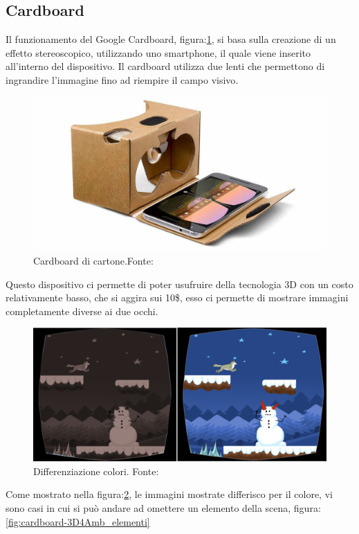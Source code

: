 \documentclass[
a4paper,
cleardoublepage=empty,
headings=twolinechapter,
numbers=autoenddot,
]{scrbook}
\begin{document}
	\subsection{Cardboard}\label{chap:cardboard}
    Il funzionamento del Google Cardboard, figura:\ref{fig:cardboard}, si basa sulla creazione di un effetto stereoscopico\cite{Stereoscopio}, utilizzando uno smartphone, il quale viene inserito all'interno del dispositivo.
	Il cardboard utilizza due lenti che permettono di ingrandire l'immagine fino ad riempire il campo visivo\cite{Funzionamento_cardboard}.
	\begin{figure}[H]
		\centering
		\includegraphics[width=0.8\linewidth]{image/cardboard}
		\caption{Cardboard di cartone.Fonte:\cite{Cardboard_image}}
		\label{fig:cardboard}
	\end{figure}
	Questo dispositivo ci permette di poter usufruire della tecnologia 3D con un costo relativamente basso, che si aggira sui 10\$, esso ci permette di mostrare immagini completamente diverse ai due occhi.
	\begin{figure}[H]
		\centering
		\includegraphics[width=0.8\linewidth]{image/3D4Amb_1}
		\caption{Differenziazione colori.
			Fonte:\cite{3d4amb}}
		\label{fig:cardboard-3D4Amb_colori}
	\end{figure}
    Come mostrato nella figura:\ref{fig:cardboard-3D4Amb_colori}, le immagini mostrate differisco per il colore, vi sono casi in cui si può andare ad omettere un elemento della scena, figura:\ref{fig:cardboard-3D4Amb_elementi}
\end{document}
